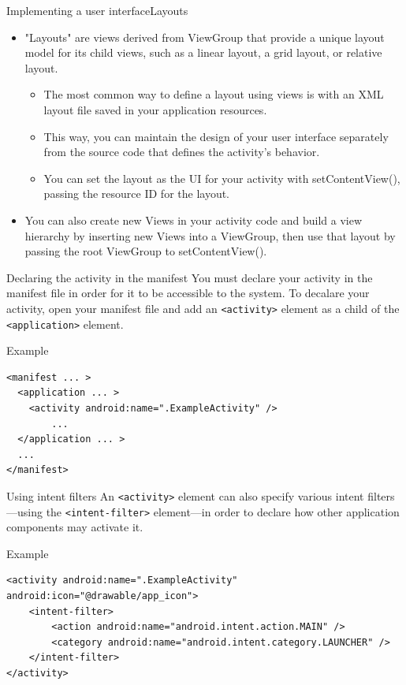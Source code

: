 \begin{frame}{Implementing a user interface}{Layouts}
\begin{itemize}
  \item "Layouts" are views derived from ViewGroup that provide a unique layout model for its child views, 
such as a linear layout, a grid layout, or relative layout.
\begin{itemize} 
\item The most common way to define a layout using views is with an XML layout
file saved in your application resources.
\item This way, you can maintain the design of your user interface separately from the source code that defines the activity's behavior.
\item You can set the layout as the UI for your activity with setContentView(),
passing the resource ID for the layout.
\end{itemize}
\item You can also create new Views in your activity code and build a view
hierarchy by inserting new Views into a ViewGroup, then use that layout by passing the root ViewGroup to setContentView().
\end{itemize}
\end{frame}

\begin{frame}[fragile]{Declaring the activity in the manifest}
You must declare your activity in the manifest file in order for it to be
accessible to the system. To decalare your activity, 
open your manifest file and add an \texttt{<activity>} element as a child of
the \texttt{<application>} element.
\begin{exampleblock}{Example}
\begin{lstlisting}
<manifest ... >
  <application ... >
    <activity android:name=".ExampleActivity" />
        ...
  </application ... >
  ...
</manifest>
\end{lstlisting}
\end{exampleblock}
\end{frame}

\begin{frame}[fragile]{Using intent filters}
An \texttt{<activity>} element can also specify various intent filters—using the
\texttt{<intent-filter>} element—in order to declare how other application components may activate it.
\begin{exampleblock}{Example}
\begin{lstlisting}
<activity android:name=".ExampleActivity" android:icon="@drawable/app_icon">
    <intent-filter>
        <action android:name="android.intent.action.MAIN" />
        <category android:name="android.intent.category.LAUNCHER" />
    </intent-filter>
</activity>
\end{lstlisting}
\end{exampleblock}
\end{frame}

